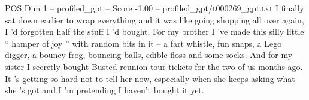 \begin{textsample}{POS Dim 1 – profiled\_gpt – Score -1.00 – profiled\_gpt/t000269\_gpt.txt}  \label{ex:f1_pos_037}
I finally sat down earlier to wrap everything and it was like going shopping all over again, I ’d forgotten half the stuff I ’d bought.
For my brother I ’ve made this silly little “ hamper of joy ” with random bits in it – a fart whistle, fun snaps, a Lego digger, a bouncy frog, bouncing balls, edible floss and some socks.
And for my sister I secretly bought Busted reunion tour tickets for the two of us months ago.
It ’s getting so hard not to tell her now, especially when she keeps asking what she ’s got and I ’m pretending I haven't bought it yet.

\end{textsample}
